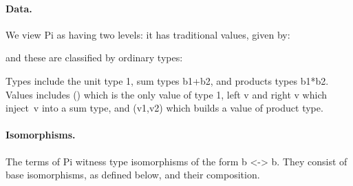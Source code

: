 \documentclass{llncs}
\newcommand{\roshan}[1]{}
\begin{document}
\roshan{The use of the word ``orthogonal'' is inappropriate in the
  footnote. Adding 0 truly affects how fractionals are developed,
  whereas when we say ``orthogonal'' we give the impression that it does
  not really matter. }

\paragraph*{Data.}
We view {{Pi}} as having two levels:  it has traditional values, given by:

\noindent and these are classified by ordinary types:

\noindent 
Types include the unit type {{1}}, sum types {{b1+b2}}, and
products types {{b1*b2}}.  Values includes {{()}} which is the only value of
type {{1}}, {{left v}} and {{right v}} which inject~{{v}} into a sum type,
and {{(v1,v2)}} which builds a value of product type. 

\roshan{It is unclear what the usage ``first-class'' and ``effect of
  an isomorphism'' indicate. Maybe we should rephrase. }

\paragraph*{Isomorphisms.} The terms of {{Pi}} witness
type isomorphisms of the form {{b <-> b}}. They consist of base
isomorphisms, as defined below, and their composition.
\end{document}
